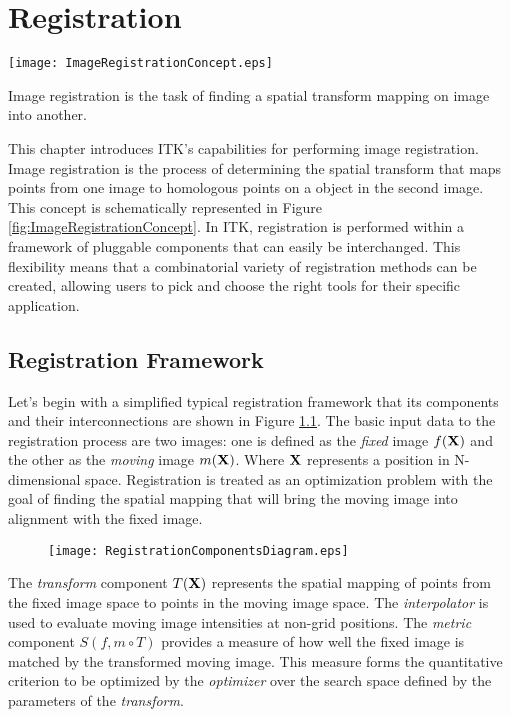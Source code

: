\chapter{Registration}

\begin{floatingfigure}[rlp]{8cm}
  \centering
  \texttt{[image: ImageRegistrationConcept.eps]}
  \caption[Image Registration Concept]{Image registration is the task of
finding a spatial transform mapping on image into
another.\label{fig:ImageRegistrationConcept}}
\end{floatingfigure}

This chapter introduces ITK's capabilities for performing image
registration. Image registration is the process of determining the spatial
transform that maps points from one image to homologous points on a object in
the second image. This concept is schematically represented in Figure
\ref{fig:ImageRegistrationConcept}. In ITK, registration is performed within
a framework of pluggable components that can easily be interchanged.  This
flexibility means that a combinatorial variety of registration methods can be
created, allowing users to pick and choose the right tools for their specific
application.


\section{Registration Framework}
Let's begin with a simplified typical registration framework that its components
and their interconnections are shown in Figure \ref{fig:RegistrationComponents}.
The basic input data to the registration process are two images: one is defined
as the \emph{fixed} image $f(\bf{X})$ and the other as the \emph{moving} image
$m(\bf{X})$. Where $\bf{X}$ represents a position in N-dimensional space.
Registration is treated as an optimization problem with the goal of finding the
spatial mapping that will bring the moving image into alignment with the fixed image.

\begin{figure}
\center
\texttt{[image: RegistrationComponentsDiagram.eps]}
\label{fig:RegistrationComponents}
\end{figure}

The \emph{transform} component $T(\bf{X})$ represents the spatial mapping of
points from the fixed image space to points in the moving image space. The
\emph{interpolator} is used to evaluate moving image intensities at non-grid
positions. The \emph{metric} component $S(f,m \circ T)$ provides a measure of
how well the fixed image is matched by the transformed moving image. This
measure forms the quantitative criterion to be optimized by the
\emph{optimizer} over the search space defined by the parameters of the
\emph{transform}.

